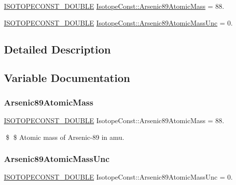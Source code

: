 \begin{DoxyCompactItemize}
\item 
\mbox{\hyperlink{group___isotope_const-_macros_ga8f45a7272ce02c0b4c65c44636ed719a}{I\+S\+O\+T\+O\+P\+E\+C\+O\+N\+S\+T\+\_\+\+D\+O\+U\+B\+LE}} \mbox{\hyperlink{group___isotope_const-_arsenic-_as89_ga2b2da01d8ebfc5ff5dc3160a5b7ec2f6}{Isotope\+Const\+::\+Arsenic89\+Atomic\+Mass}} = 88.
\item 
\mbox{\hyperlink{group___isotope_const-_macros_ga8f45a7272ce02c0b4c65c44636ed719a}{I\+S\+O\+T\+O\+P\+E\+C\+O\+N\+S\+T\+\_\+\+D\+O\+U\+B\+LE}} \mbox{\hyperlink{group___isotope_const-_arsenic-_as89_gafe41ba4474d20f0a0f5c74773e91ce4e}{Isotope\+Const\+::\+Arsenic89\+Atomic\+Mass\+Unc}} = 0.
\end{DoxyCompactItemize}


\subsection{Detailed Description}


\subsection{Variable Documentation}
\mbox{\label{group___isotope_const-_arsenic-_as89_ga2b2da01d8ebfc5ff5dc3160a5b7ec2f6}} 
\subsubsection{\texorpdfstring{Arsenic89\+Atomic\+Mass}{Arsenic89AtomicMass}}
{\footnotesize\ttfamily \mbox{\hyperlink{group___isotope_const-_macros_ga8f45a7272ce02c0b4c65c44636ed719a}{I\+S\+O\+T\+O\+P\+E\+C\+O\+N\+S\+T\+\_\+\+D\+O\+U\+B\+LE}} Isotope\+Const\+::\+Arsenic89\+Atomic\+Mass = 88.}

\$ \$ Atomic mass of Arsenic-\/89 in amu. \mbox{\label{group___isotope_const-_arsenic-_as89_gafe41ba4474d20f0a0f5c74773e91ce4e}} 
\subsubsection{\texorpdfstring{Arsenic89\+Atomic\+Mass\+Unc}{Arsenic89AtomicMassUnc}}
{\footnotesize\ttfamily \mbox{\hyperlink{group___isotope_const-_macros_ga8f45a7272ce02c0b4c65c44636ed719a}{I\+S\+O\+T\+O\+P\+E\+C\+O\+N\+S\+T\+\_\+\+D\+O\+U\+B\+LE}} Isotope\+Const\+::\+Arsenic89\+Atomic\+Mass\+Unc = 0.}

